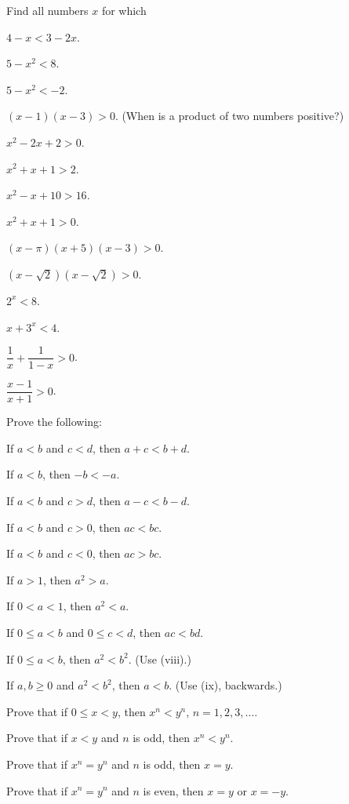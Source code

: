  Find all numbers $x$ for which
\begin{romans}
\item $4 - x < 3 - 2x$.
\item $5 - x^2 < 8$.
\item $5 - x^2 < -2$.
\item $(x-1)(x-3) > 0$. (When is a product of two numbers positive?)
\item $x^2 - 2x + 2 > 0$.
\item $x^2 + x + 1 > 2$.
\item $x^2 - x + 10 > 16$.
\item $x^2 + x + 1 > 0$.
\item $(x-\pi)(x+5)(x-3) > 0$.
\item $(x-\sqrt{2})(x-\sqrt{2}) > 0$.
\item $2^x < 8$.
\item $x + 3^x < 4$.
\item $\dfrac{1}{x} + \dfrac{1}{1-x} > 0$.
\item $\dfrac{x-1}{x+1} > 0$. %
\end{romans}

 Prove the following:
\begin{romans}
\item If $a < b$ and $c < d$, then $a + c < b + d$.
\item If $a < b$, then $-b < -a$.
\item If $a < b$ and $c > d$, then $a - c < b - d$.
\item If $a < b$ and $c > 0$, then $ac < bc$.
\item If $a < b$ and $c < 0$, then $ac > bc$.
\item If $a > 1$, then $a^2 > a$.
\item If $0 < a < 1$, then $a^2 < a$.
\item If $0 \leq a < b$ and $0 \leq c < d$, then $ac < bd$.
\item If $0 \leq a < b$, then $a^2 < b^2$. (Use (viii).)
\item If $a, b \geq 0$ and $a^2 < b^2$, then $a < b$. (Use (ix), backwards.)
\end{romans}

\begin{letters}
\item Prove that if $0 \leq x < y$, then $x^n < y^n$, $n = 1, 2, 3, \dots$.
\item Prove that if $x < y$ and $n$ is odd, then $x^n < y^n$.
\item Prove that if $x^n = y^n$ and $n$ is odd, then $x = y$.
\item Prove that if $x^n = y^n$ and $n$ is even, then $x = y$ or $x = -y$.
\end{letters}

